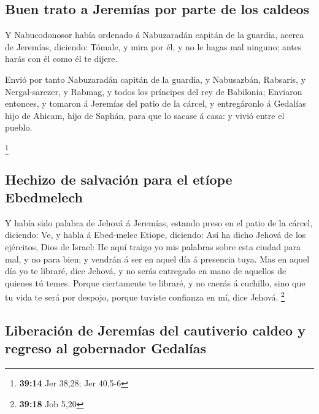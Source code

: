 \hypertarget{buen-trato-a-jeremuxedas-por-parte-de-los-caldeos}{%
\subsection{Buen trato a Jeremías por parte de los
caldeos}\label{buen-trato-a-jeremuxedas-por-parte-de-los-caldeos}}

 Y Nabucodonosor había ordenado á Nabuzaradán capitán de la
guardia, acerca de Jeremías, diciendo:  Tómale, y mira por
él, y no le hagas mal ninguno; antes harás con él como él te dijere.

 Envió por tanto Nabuzaradán capitán de la guardia, y
Nabusazbán, Rabsaris, y Nergal-sarezer, y Rabmag, y todos los príncipes
del rey de Babilonia;  Enviaron entonces, y tomaron á
Jeremías del patio de la cárcel, y entregáronlo á Gedalías hijo de
Ahicam, hijo de Saphán, para que lo sacase á casa: y vivió entre el
pueblo.

\footnote{\textbf{39:14} Jer 38,28; Jer 40,5-6}

\hypertarget{hechizo-de-salvaciuxf3n-para-el-etuxedope-ebedmelech}{%
\subsection{Hechizo de salvación para el etíope
Ebedmelech}\label{hechizo-de-salvaciuxf3n-para-el-etuxedope-ebedmelech}}

 Y había sido palabra de Jehová á Jeremías, estando preso
en el patio de la cárcel, diciendo:  Ve, y habla á
Ebed-melec Etiope, diciendo: Así ha dicho Jehová de los ejércitos, Dios
de Israel: He aquí traigo yo mis palabras sobre esta ciudad para mal, y
no para bien; y vendrán á ser en aquel día á presencia tuya.
 Mas en aquel día yo te libraré, dice Jehová, y no serás
entregado en mano de aquellos de quienes tú temes.  Porque
ciertamente te libraré, y no caerás á cuchillo, sino que tu vida te será
por despojo, porque tuviste confianza en mí, dice Jehová. \footnote{\textbf{39:18}
  Job 5,20}

\hypertarget{liberaciuxf3n-de-jeremuxedas-del-cautiverio-caldeo-y-regreso-al-gobernador-gedaluxedas}{%
\subsection{Liberación de Jeremías del cautiverio caldeo y regreso al
gobernador
Gedalías}\label{liberaciuxf3n-de-jeremuxedas-del-cautiverio-caldeo-y-regreso-al-gobernador-gedaluxedas}}

